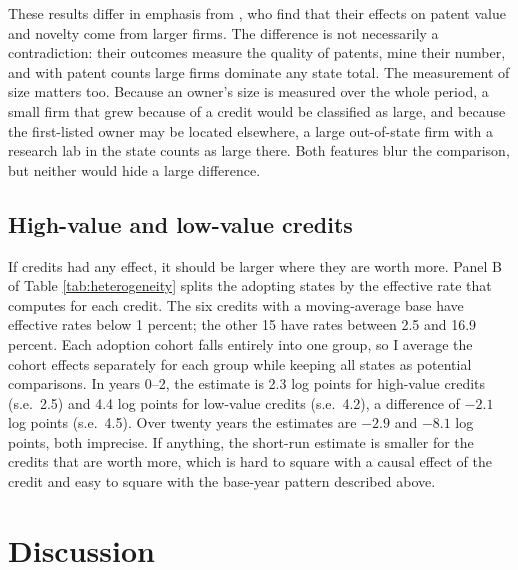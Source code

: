 \documentclass[12pt]{article}
\begin{document}
These results differ in emphasis from \citet{melnik2024rd}, who find that their effects on patent value and
novelty come from larger firms. The difference is not necessarily a contradiction: their outcomes measure
the quality of patents, mine their number, and with patent counts large firms dominate any state total. The
measurement of size matters too. Because an owner's size is measured over the whole period, a small firm that
grew because of a credit would be classified as large, and because the first-listed owner may be located
elsewhere, a large out-of-state firm with a research lab in the state counts as large there. Both features blur
the comparison, but neither would hide a large difference.

\subsection{High-value and low-value credits}

If credits had any effect, it should be larger where they are worth more. Panel B of Table
\ref{tab:heterogeneity} splits the adopting states by the effective rate that \citet{wilson2009beggar} computes
for each credit. The six credits with a moving-average base have effective rates below 1 percent; the other 15
have rates between 2.5 and 16.9 percent. Each adoption cohort falls entirely into one group, so I average the
cohort effects separately for each group while keeping all states as potential comparisons. In years 0--2, the
estimate is 2.3 log points for high-value credits (s.e.\ 2.5) and 4.4 log points for low-value credits
(s.e.\ 4.2), a difference of $-2.1$ log points (s.e.\ 4.5). Over twenty years the estimates are $-2.9$ and $-8.1$
log points, both imprecise. If anything, the short-run estimate is smaller for the credits that are worth more,
which is hard to square with a causal effect of the credit and easy to square with the base-year pattern
described above.



\section{Discussion}\label{sec:discussion}
\end{document}
